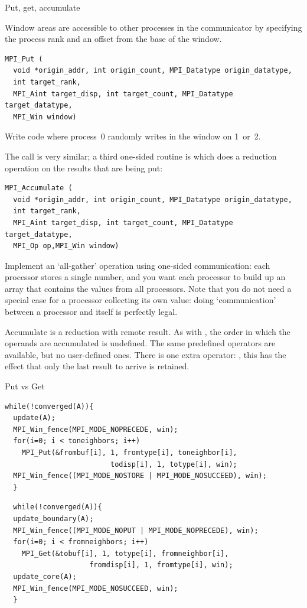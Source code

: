 
 {Put, get, accumulate}

Window areas are 
accessible to other processes in the communicator by specifying the
process rank and an offset from the base of the window.
\begin{verbatim}
MPI_Put (
  void *origin_addr, int origin_count, MPI_Datatype origin_datatype,
  int target_rank,
  MPI_Aint target_disp, int target_count, MPI_Datatype target_datatype,
  MPI_Win window)
\end{verbatim}

\begin{exercise}
  \label{ex:randomput}
  Write code where process~0 randomly writes in the window on 1~or~2.
  
\end{exercise}

The  call is very similar; a third one-sided routine
is  which does a reduction operation on the results
that are being put:
\begin{verbatim}
MPI_Accumulate (
  void *origin_addr, int origin_count, MPI_Datatype origin_datatype, 
  int target_rank,
  MPI_Aint target_disp, int target_count, MPI_Datatype target_datatype,
  MPI_Op op,MPI_Win window)
\end{verbatim}

\begin{exercise}
  Implement an `all-gather' operation using one-sided communication:
  each processor stores a single number, and you want each processor
  to build up an array that contains the values from all
  processors. Note that you do not need a special case for a processor
  collecting its own value: doing `communication' between a processor
  and itself is perfectly legal.
\end{exercise}

Accumulate is a reduction with remote result. As with , the 
order in which the operands are accumulated is undefined. 
The same predefined operators are available, but no
user-defined ones. There is one extra operator: ,
this has the effect that only the last result to arrive is retained.

 {Put vs Get}

\begin{verbatim}
while(!converged(A)){ 
  update(A); 
  MPI_Win_fence(MPI_MODE_NOPRECEDE, win); 
  for(i=0; i < toneighbors; i++) 
    MPI_Put(&frombuf[i], 1, fromtype[i], toneighbor[i], 
                         todisp[i], 1, totype[i], win); 
  MPI_Win_fence((MPI_MODE_NOSTORE | MPI_MODE_NOSUCCEED), win); 
  } 
\end{verbatim}
\begin{verbatim}
  while(!converged(A)){ 
  update_boundary(A); 
  MPI_Win_fence((MPI_MODE_NOPUT | MPI_MODE_NOPRECEDE), win); 
  for(i=0; i < fromneighbors; i++) 
    MPI_Get(&tobuf[i], 1, totype[i], fromneighbor[i], 
                    fromdisp[i], 1, fromtype[i], win); 
  update_core(A); 
  MPI_Win_fence(MPI_MODE_NOSUCCEED, win); 
  } 
\end{verbatim}

